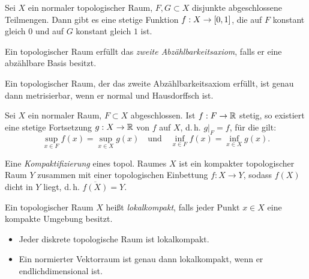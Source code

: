 \documentclass{cheat-sheet}
\begin{document}
\begin{lem}[Urysohn]
  Sei $X$ ein normaler topologischer Raum, $F, G \subset X$ disjunkte abgeschlossene Teilmengen. Dann gibt es eine stetige Funktion $f : X \to \left[ 0, 1 \right]$, die auf $F$ konstant gleich $0$ und auf $G$ konstant gleich $1$ ist.
\end{lem}

\begin{defn}
  Ein topologischer Raum erfüllt das \emph{zweite Abzählbarkeitsaxiom}, falls er eine abzählbare Basis besitzt.
\end{defn}

\begin{satz}
  Ein topologischer Raum, der das zweite Abzählbarkeitsaxiom erfüllt, ist genau dann metrisierbar, wenn er normal und Hausdorffsch ist.
\end{satz}

\begin{satz}
  Sei $X$ ein normaler Raum, $F \subset X$ abgeschlossen. Ist $f : F \to \mathbb{R}$ stetig, so existiert eine stetige Fortsetzung $g : X \to \mathbb{R}$ von $f$ auf $X$, d.\,h. $g|_F = f$, für die gilt:
  \[
    \sup_{x \in F} f(x) = \sup_{x \in X} g(x)
    \quad \text{und} \quad
    \inf_{x \in F} f(x) = \inf_{x \in X} g(x).
  \]
\end{satz}


\begin{defn}
  Eine \emph{Kompaktifizierung} eines topol. Raumes $X$ ist ein kompakter topologischer Raum $Y$ zusammen mit einer topologischen Einbettung $f : X \to Y$, sodass $f(X)$ dicht in $Y$ liegt, d.\,h. $\overline{f(X)} = Y$.
\end{defn}

\begin{defn}
  Ein topologischer Raum $X$ heißt \emph{lokalkompakt}, falls jeder Punkt $x \in X$ eine kompakte Umgebung besitzt.
\end{defn}

\begin{bspe}
  \begin{itemize}
    \item Jeder diskrete topologische Raum ist lokalkompakt.
    \item Ein normierter Vektorraum ist genau dann lokalkompakt, wenn er endlichdimensional ist.
  \end{itemize}
\end{bspe}
\end{document}
